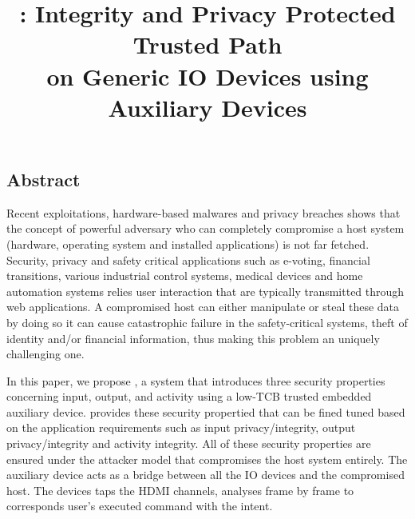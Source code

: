 

\newif\ifpaper
\papertrue


\newif\ifdesperatetime

\graphicspath{{images/}}


\title{\Large \bf \name: Integrity and Privacy Protected Trusted Path \\on Generic IO Devices using Auxiliary Devices}

\iffalse
\author{\IEEEauthorblockN{Aritra Dhar}
\IEEEauthorblockA{ETH Z{\"u}rich\\
aritra.dhar@inf.ethz.ch}
}
\fi
\maketitle
\subsection*{Abstract}

Recent exploitations, hardware-based malwares and privacy breaches shows that the concept of powerful adversary who can completely compromise a host system (hardware, operating system and installed applications) is not far fetched. Security, privacy and safety critical applications such as e-voting, financial transitions, various industrial control systems, medical devices and home automation systems relies user interaction that are typically transmitted through web applications. A compromised host can either manipulate or steal these data by doing so it can cause catastrophic failure in the safety-critical systems, theft of identity and/or financial information, thus making this problem an uniquely challenging one.

In this paper, we propose \name, a system that introduces three security properties concerning input, output, and activity using a low-TCB trusted embedded auxiliary device. \name provides these security propertied that can be fined tuned based on the application requirements such as input privacy/integrity, output privacy/integrity and activity integrity. All of these security properties are ensured under the attacker model that compromises the host system entirely. The auxiliary device acts as a bridge between all the IO devices and the compromised host. The devices taps the HDMI channels, analyses frame by frame to corresponds user's executed command with the intent. 








{\normalsize  

}


